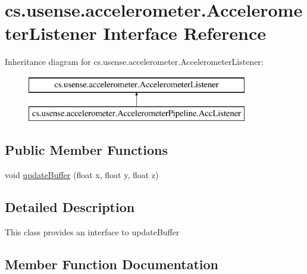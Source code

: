 \hypertarget{interfacecs_1_1usense_1_1accelerometer_1_1_accelerometer_listener}{}\section{cs.\+usense.\+accelerometer.\+Accelerometer\+Listener Interface Reference}
\label{interfacecs_1_1usense_1_1accelerometer_1_1_accelerometer_listener}
Inheritance diagram for cs.\+usense.\+accelerometer.\+Accelerometer\+Listener\+:\begin{figure}[H]
\begin{center}
\leavevmode
\includegraphics[height=2.000000cm]{interfacecs_1_1usense_1_1accelerometer_1_1_accelerometer_listener}
\end{center}
\end{figure}
\subsection*{Public Member Functions}
\begin{DoxyCompactItemize}
\item 
void \hyperlink{interfacecs_1_1usense_1_1accelerometer_1_1_accelerometer_listener_a0cb07e6b7168b1e1901a0dae51394372}{update\+Buffer} (float x, float y, float z)
\end{DoxyCompactItemize}


\subsection{Detailed Description}
This class provides an interface to update\+Buffer 

\subsection{Member Function Documentation}
\hypertarget{interfacecs_1_1usense_1_1accelerometer_1_1_accelerometer_listener_a0cb07e6b7168b1e1901a0dae51394372}{}
